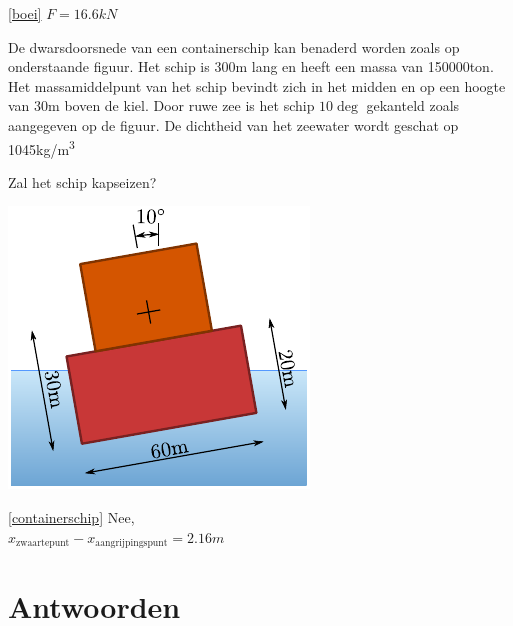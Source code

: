 \begin{antwoord}{\ref{boei}}
	$F = 16.6\unit{kN}$
\end{antwoord}
\begin{toepassing}
	\label{containerschip}
De dwarsdoorsnede van een containerschip kan benaderd worden zoals op onderstaande figuur. Het schip is 300m lang en heeft een massa van 150000ton. Het massamiddelpunt van het schip bevindt zich in het midden en op een hoogte van 30m boven de kiel. Door ruwe zee is het schip $10\deg$ gekanteld zoals aangegeven op de figuur. De dichtheid van het zeewater wordt geschat op 1045\unit{kg/m^3}
		
Zal het schip kapseizen?
		
	\centering
	\includegraphics{fig/hydrostatica/containerschip}
\end{toepassing}
\begin{antwoord}{\ref{containerschip}}
	Nee,\\ $x_\text{zwaartepunt}-x_\text{aangrijpingspunt} = 2.16\unit{m}$
\end{antwoord}
	
\section*{Antwoorden}
	\begin{multicols}{2}
	\end{multicols}